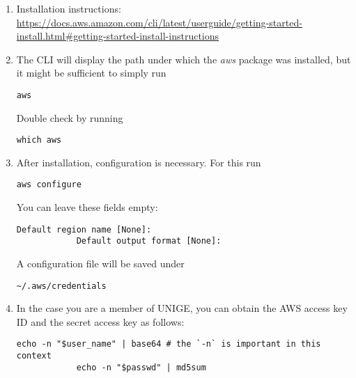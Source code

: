 \documentclass[12pt, a4paper]{article}
\numberwithin{equation}{section}
\theoremstyle{definition}
\theoremstyle{definition}
\begin{document}
	\begin{enumerate}
		\item Installation instructions:~ \url{https://docs.aws.amazon.com/cli/latest/userguide/getting-started-install.html#getting-started-install-instructions}
		\item The CLI will display the path under which the \textit{aws} package was installed, but it might be sufficient to simply run 
		
		\begin{lstlisting}[style=mystylebash, label=alg:aws, xleftmargin=\parindent]
			aws
		\end{lstlisting}
		
		Double check by running 
		
		\begin{lstlisting}[style=mystylebash, label=alg:aws_path, xleftmargin=\parindent]
			which aws
		\end{lstlisting}
		
		\item After installation, configuration is necessary. For this run
		
		\begin{lstlisting}[style=mystylebash, label=alg:aws_configure, xleftmargin=\parindent]
			aws configure
		\end{lstlisting}
		
		You can leave these fields empty:
		
		\begin{lstlisting}[style=mystylebash, label=alg:aws_configure__default_reg, xleftmargin=\parindent]
			Default region name [None]:
			Default output format [None]:
		\end{lstlisting}
		
		A configuration file will be saved under 
		
		\begin{lstlisting}[style=mystylebash, label=alg:aws__config_file, xleftmargin=\parindent]
			~/.aws/credentials
		\end{lstlisting}
		
		\item In the case you are a member of UNIGE, you can obtain the AWS access key ID and the secret access key as follows:
		
		\begin{lstlisting}[style=mystylebash, label=alg:aws__access_secret_key, xleftmargin=\parindent]
			echo -n "$user_name" | base64 # the `-n` is important in this context
			echo -n "$passwd" | md5sum
		\end{lstlisting}
		

\end{enumerate}
\end{document}

